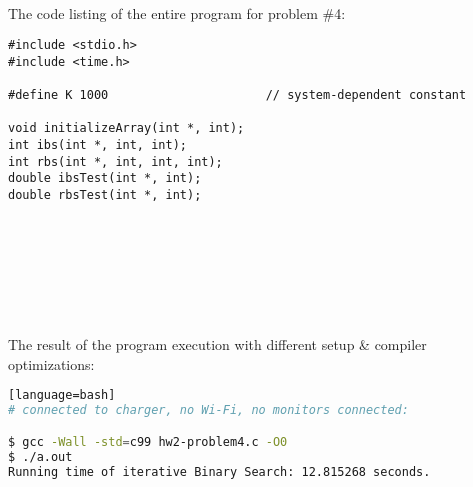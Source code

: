 \documentclass{article}
\begin{document}
\paragraph{}\
\paragraph{}\
\paragraph{}\
\paragraph{}\
\paragraph{}\

		\rmfamily\
		
		\noindent The code listing of the entire program for problem \#4:
		\begin{verbatim}
#include <stdio.h>
#include <time.h>

#define K 1000                      // system-dependent constant

void initializeArray(int *, int);
int ibs(int *, int, int);
int rbs(int *, int, int, int);
double ibsTest(int *, int);
double rbsTest(int *, int);

		\end{verbatim}


\paragraph{}\
\paragraph{}\
\paragraph{}\




\noindent The result of the program execution with different setup \& compiler optimizations:



	
	\ttfamily
	\begin{lstlisting}[basicstyle=\small, language=bash][language=bash]
# connected to charger, no Wi-Fi, no monitors connected:

$ gcc -Wall -std=c99 hw2-problem4.c -O0
$ ./a.out
Running time of iterative Binary Search: 12.815268 seconds.
	\end{lstlisting}
\end{document}
